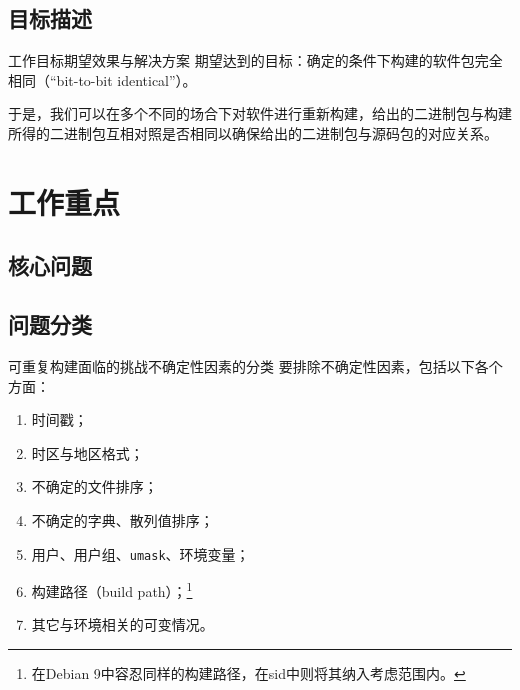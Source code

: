 \documentclass{beamer}
\begin{document}
\subsection{目标描述}
\begin{frame}{工作目标}{期望效果与解决方案}
期望达到的目标：确定的条件下构建的软件包完全相同（“bit-to-bit identical”）。

于是，我们可以在多个不同的场合下对软件进行重新构建，给出的二进制包与构建所得的二进制包互相对照是否相同以确保给出的二进制包与源码包的对应关系。
\end{frame}
\section{工作重点}
\subsection{核心问题}
\subsection{问题分类}
\begin{frame}{可重复构建面临的挑战}{不确定性因素的分类}
要排除不确定性因素，包括以下各个方面：

\vspace{1em}
\begin{enumerate}
\item 时间戳；
\item 时区与地区格式；
\item 不确定的文件排序；
\item 不确定的字典、散列值排序；
\item 用户、用户组、\texttt{umask}、环境变量；
\item 构建路径（build path）；\footnote{在Debian 9中容忍同样的构建路径，在sid中则将其纳入考虑范围内。\vspace{1em}}
\item 其它与环境相关的可变情况。
\end{enumerate}
\end{frame}
\end{document}
